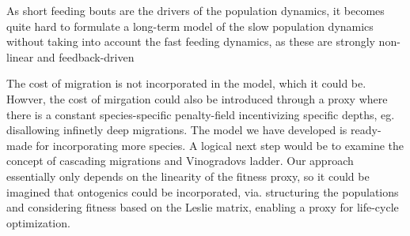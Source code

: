 As short feeding bouts are the drivers of the population dynamics, it becomes quite hard to formulate a long-term model of the slow population dynamics without taking into account the fast feeding dynamics, as these are strongly non-linear and feedback-driven


  The cost of migration is not incorporated in the model, which it could be. Howver, the cost of mirgation could also be introduced through a proxy where there is a constant species-specific penalty-field incentivizing specific depths, eg. disallowing infinetly deep migrations.
  The model we have developed is ready-made for incorporating more species. A logical next step would be to examine the concept of cascading migrations and Vinogradovs ladder. Our approach essentially only depends on the linearity of the fitness proxy, so it could be imagined that ontogenics could be incorporated, via. structuring the populations and considering fitness based on the Leslie matrix, enabling a proxy for life-cycle optimization.



